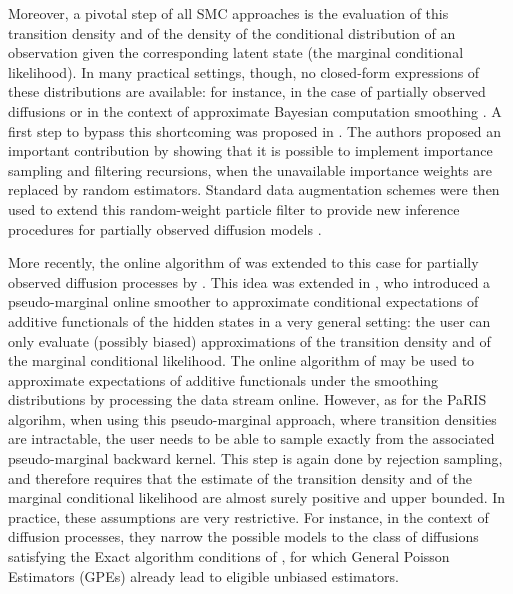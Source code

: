 \documentclass{article}
\begin{document}
Moreover, a pivotal step of all SMC approaches is the evaluation of this transition density and of the density of the conditional distribution of an observation given the corresponding latent state (the marginal conditional likelihood).
In many practical settings, though, no closed-form expressions of these distributions are available: for instance, in the case of partially observed diffusions \cite{andersson2017unbiased,fearnhead2017continuous} or in the context of  approximate Bayesian computation smoothing \cite{martin:jasra:singh:whiteley:delmoral:maccoy:2014}.
 A first step to bypass this shortcoming was proposed in  \cite{fearnhead2010random}. %
The authors proposed an important contribution by showing that it is possible to implement importance sampling and filtering recursions, when the unavailable importance weights are replaced by random estimators.
Standard data augmentation schemes were then used to extend this random-weight particle filter to provide new inference procedures for partially observed diffusion models \cite{yonekura:beskos:2020}. 

More recently, the online algorithm of \cite{olsson2017efficient} was extended to this case for partially observed diffusion processes by \cite{gloaguen2018online}. 
This idea was extended in \cite{gloaguen2021pseudo}, who introduced a pseudo-marginal online smoother to approximate conditional expectations of additive functionals of the hidden states in a very general setting: the user can only evaluate (possibly biased) approximations of the transition density and of the marginal conditional likelihood. 
The online algorithm of \cite{gloaguen2021pseudo} may be used to approximate expectations of additive functionals under the smoothing distributions by processing the data stream online.
However, as for the PaRIS algorihm,  when using this pseudo-marginal approach, where transition densities are intractable, the user needs to be able to sample exactly from the associated pseudo-marginal backward kernel. 
This step is again done by rejection sampling, and therefore requires that the estimate of the transition density and of the marginal conditional  likelihood  are almost surely positive and upper bounded.  
In practice, these assumptions are very restrictive. %
For instance, in the context of diffusion processes, they narrow the possible models to the class of diffusions satisfying the Exact algorithm conditions of \cite{beskos2006retrospective}, for which  General Poisson Estimators (GPEs) \cite{fearnhead2008particle} already lead to eligible unbiased estimators.  
\end{document}

